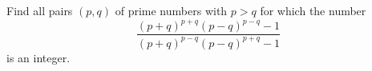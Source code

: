 Find all pairs $\left(p,q\right)$ of prime numbers with $p>q$ for which the number \[\frac{\left(p+q\right)^{p+q}\left(p-q\right)^{p-q}-1}{\left(p+q\right)^{p-q}\left(p-q\right)^{p+q}-1}\] is an integer.